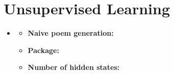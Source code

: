 
\section{Unsupervised Learning}
\medskip
\begin{itemize}

    \item {}

    \begin{itemize}
    \item \textbf{Naive poem generation:}
    \item \textbf{Package:}
    \item \textbf{Number of hidden states:}
    \end{itemize}


\end{itemize}


